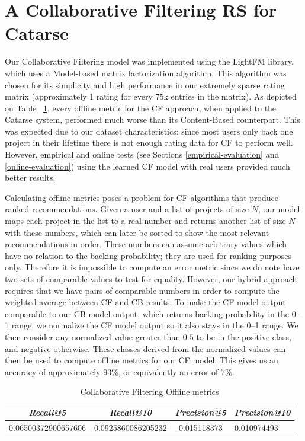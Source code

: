 \documentclass[cic,tc,english]{iiufrgs}
\begin{document}
\section{A Collaborative Filtering RS for Catarse} \label{cf-results}
Our Collaborative Filtering model was implemented using the LightFM library, which uses a Model-based matrix factorization algorithm. This algorithm was chosen for its simplicity and high performance in our extremely sparse rating matrix (approximately 1 rating for every 75k entries in the matrix). As depicted on Table ~\ref{tbl:cf_offline_metrics}, every offline metric for the CF approach, when applied to the Catarse system, performed much worse than its Content-Based counterpart. This was expected due to our dataset characteristics: since most users only back one project in their lifetime there is not enough rating data for CF to perform well. However, empirical and online tests (see Sections \ref{empirical-evaluation} and \ref{online-evaluation}) using the learned CF model with real users provided much better results.

Calculating offline metrics poses a problem for CF algorithms that produce ranked recommendations. Given a user and a list of projects of size $N$, our model maps each project in the list to a real number and returns another list of size $N$ with these numbers, which can later be sorted to show the most relevant recommendations in order. These numbers can assume arbitrary values which have no relation to the backing probability; they are used for ranking purposes only. Therefore it is impossible to compute an error metric since we do note have two sets of comparable values to test for equality. However, our hybrid approach requires that we have pairs of comparable numbers in order to compute the weighted average between CF and CB results. To make the CF model output comparable to our CB model output, which returns backing probability in the 0--1 range, we normalize the CF model output so it also stays in the 0--1 range. We then consider any normalized value greater than $0.5$ to be in the positive class, and negative otherwise. These classes derived from the normalized values can then be used to compute offline metrics for our CF model. This gives us an accuracy of approximately $93\%$, or equivalently an error of $7\%$.  


\begin{table}[ht!]
    \caption{Collaborative Filtering Offline metrics}
    \centering
        \begin{tabular}{c|c|c|p{2.7cm}}
          \hline
          \textit{Recall@5}  &   \textit{Recall@10}  &   \textit{Precision@5} &   \textit{Precision@10} \\
          \hline
          \hline
          0.06500372900657606           & 0.0925860086205232 &  0.015118373  & 0.010974493  \\
          \hline
        \end{tabular}
    \label{tbl:cf_offline_metrics}
\end{table}
\end{document}
